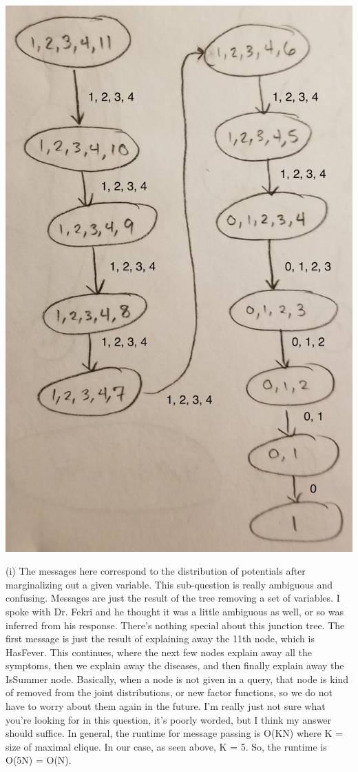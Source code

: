\documentclass[12pt]{article}
\begin{document}
\includegraphics[scale=0.1]{q8b-cliquetree}

(i) The messages here correspond to the distribution of potentials after marginalizing out a given variable. This sub-question is really ambiguous and confusing. Messages are just the result of the tree removing a set of variables. I spoke with Dr. Fekri and he thought it was a little ambiguous as well, or so was inferred from his response. There's nothing special about this junction tree. The first message is just the result of explaining away the 11th node, which is HasFever. This continues, where the next few nodes explain away all the symptoms, then we explain away the diseases, and then finally explain away the IsSummer node. Basically, when a node is not given in a query, that node is kind of removed from the joint distributions, or new factor functions, so we do not have to worry about them again in the future. I'm really just not sure what you're looking for in this question, it's poorly worded, but I think my answer should suffice. In general, the runtime for message passing is O(KN) where K = size of maximal clique. In our case, as seen above, K = 5. So, the runtime is O(5N) = O(N).
\end{document}
